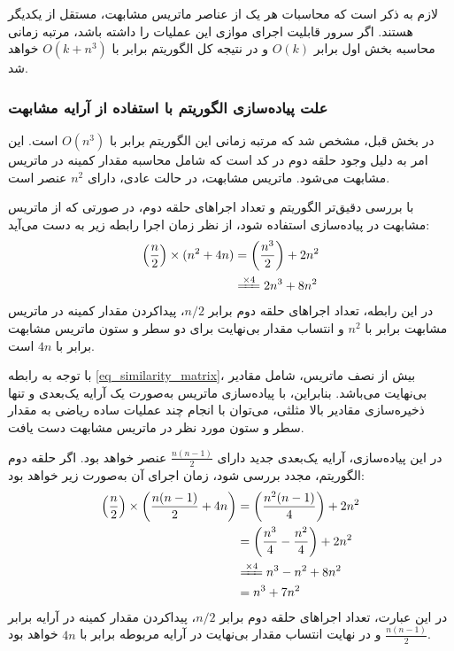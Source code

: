 لازم به ذکر است که محاسبات هر یک از عناصر ماتریس مشابهت، مستقل از یکدیگر هستند. اگر سرور قابلیت اجرای موازی این عملیات را داشته باشد، مرتبه زمانی محاسبه بخش اول برابر
\( O(k) \) 
و در نتیجه کل الگوریتم برابر با
\( O(k + n^3) \)
خواهد شد.

\vspace{3mm}
\subsubsection{
	علت پیاده‌سازی الگوریتم با استفاده از آرایه مشابهت
}\vspace{-1mm}
در بخش قبل، مشخص شد که مرتبه زمانی این الگوریتم برابر با \(O(n^3)\) است. این امر به دلیل وجود حلقه دوم در کد است که شامل محاسبه مقدار کمینه در ماتریس مشابهت می‌شود. ماتریس مشابهت، در حالت عادی، دارای \(n^2\) عنصر است.

با بررسی دقیق‌تر الگوریتم و تعداد اجراهای حلقه دوم، در صورتی که از ماتریس مشابهت در پیاده‌سازی استفاده شود، از نظر زمان اجرا رابطه زیر به دست می‌آید:
\begin{equation}
	\begin{align*} 
		\left(\frac{n}{2}\right) \times (n^2 + 4n) &= \left(\frac{n^3}{2}\right)+2n^2 \\
		 &\xlongequal{\times 4} 2n^3 + 8n^2
	\end{align*}
\end{equation}
در این رابطه، تعداد اجراهای حلقه دوم برابر \(n/2\)، پیداکردن مقدار کمینه در ماتریس مشابهت برابر با \(n^2\) و انتساب مقدار بی‌نهایت برای دو سطر و ستون ماتریس مشابهت برابر با \(4n\) است.

با توجه به رابطه
\ref{eq_similarity_matrix}،
بیش از نصف ماتریس، شامل مقادیر بی‌نهایت می‌باشد. بنابراین، با پیاده‌سازی ماتریس به‌صورت یک آرایه یک‌بعدی و تنها ذخیره‌سازی مقادیر بالا مثلثی، می‌توان با انجام چند عملیات ساده ریاضی به مقدار سطر و ستون مورد نظر در ماتریس مشابهت دست یافت.

در این پیاده‌سازی، آرایه یک‌بعدی جدید دارای \(\frac{n(n-1)}{2}\) عنصر خواهد بود. اگر حلقه دوم الگوریتم، مجدد بررسی شود، زمان اجرای آن به‌صورت زیر خواهد بود:
\begin{equation}
	\begin{align*} 
		\left(\frac{n}{2}\right) \times \left(\frac{n(n-1)}{2} + 4n\right) &= \left(\frac{n^2(n-1)}{4} \right)+2n^2 \\
		&= \left(\frac{n^3}{4} - \frac{n^2}{4}\right) +2n^2 \\
		&\xlongequal{\times 4} n^3-n^2+8n^2 \\
		&= n^3+7n^2
	\end{align*}
\end{equation}
در این عبارت، تعداد اجراهای حلقه دوم برابر \(n/2\)، پیداکردن مقدار کمینه در آرایه برابر \(\frac{n(n-1)}{2}\) و در نهایت انتساب مقدار بی‌نهایت در آرایه مربوطه برابر با \(4n\) خواهد بود.

